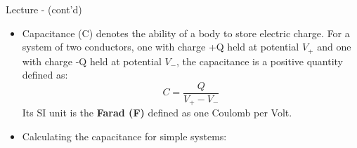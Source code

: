%
%
%

\begin{frame}{Lecture \summarizedlecture - \lecturesummarytitle (cont'd)}

\begin{itemize}

   \item Capacitance (C) denotes the ability of a body to store electric charge.
             For a system of two conductors, one with charge +Q held at
             potential $V_{+}$ and one with charge -Q held at potential $V_{-}$,
             the capacitance is a positive
             quantity defined as:
      \begin{equation*}
          C = \frac{Q}{V_{+} - V_{-}}
      \end{equation*}
      Its SI unit is the {\bf Farad (F)} defined as one Coulomb per Volt.

   \vspace{0.1cm}

   \item Calculating the capacitance for simple systems:


\end{itemize}

\end{frame}


%
%
%

